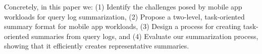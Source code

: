 



Concretely, in this paper we:
(1) Identify the challenges posed by mobile app workloads for query log summarization,
(2) Propose a two-level, task-oriented summary format for mobile app workloads,
(3) Design a process for creating task-oriented summaries from query logs, and
(4) Evaluate our summarization process, showing that it efficiently creates representative summaries.



